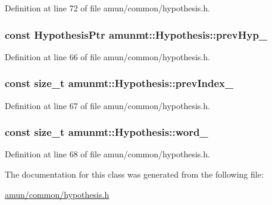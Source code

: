 Definition at line 72 of file amun/common/hypothesis.\+h.

\subsubsection[{\texorpdfstring{prev\+Hyp\+\_\+}{prevHyp_}}]{\setlength{\rightskip}{0pt plus 5cm}const {\bf Hypothesis\+Ptr} amunmt\+::\+Hypothesis\+::prev\+Hyp\+\_\+\hspace{0.3cm}{\ttfamily [private]}}\hypertarget{classamunmt_1_1Hypothesis_a8ba3f6fe75f50058b2c603c2ee95ea1d}{}\label{classamunmt_1_1Hypothesis_a8ba3f6fe75f50058b2c603c2ee95ea1d}


Definition at line 66 of file amun/common/hypothesis.\+h.

\subsubsection[{\texorpdfstring{prev\+Index\+\_\+}{prevIndex_}}]{\setlength{\rightskip}{0pt plus 5cm}const size\+\_\+t amunmt\+::\+Hypothesis\+::prev\+Index\+\_\+\hspace{0.3cm}{\ttfamily [private]}}\hypertarget{classamunmt_1_1Hypothesis_a5355d866faa0fecc4bbbf3a828541086}{}\label{classamunmt_1_1Hypothesis_a5355d866faa0fecc4bbbf3a828541086}


Definition at line 67 of file amun/common/hypothesis.\+h.

\subsubsection[{\texorpdfstring{word\+\_\+}{word_}}]{\setlength{\rightskip}{0pt plus 5cm}const size\+\_\+t amunmt\+::\+Hypothesis\+::word\+\_\+\hspace{0.3cm}{\ttfamily [private]}}\hypertarget{classamunmt_1_1Hypothesis_a4122e8c47d3f68c1fb265ada42d4b891}{}\label{classamunmt_1_1Hypothesis_a4122e8c47d3f68c1fb265ada42d4b891}


Definition at line 68 of file amun/common/hypothesis.\+h.



The documentation for this class was generated from the following file\+:\begin{DoxyCompactItemize}
\item 
\hyperlink{amun_2common_2hypothesis_8h}{amun/common/hypothesis.\+h}\end{DoxyCompactItemize}
